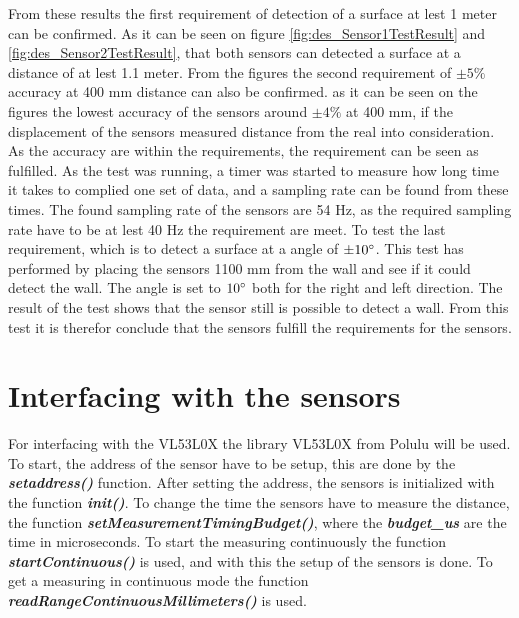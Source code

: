 From these results the first requirement of detection of a surface at lest 1 meter can be confirmed. As it can be seen on figure \ref{fig:des_Sensor1TestResult} and \ref{fig:des_Sensor2TestResult}, that both sensors can detected a surface at a distance of at lest 1.1 meter.
\newline
From the figures the second requirement of $\pm5 \%$ accuracy at 400 mm distance can also be confirmed. as it can be seen on the figures the lowest accuracy of the sensors around $\pm 4 \%$ at 400 mm, if the displacement of the sensors measured distance from the real into consideration. As the accuracy are within the requirements, the requirement can be seen as fulfilled.
\newline
As the test was running, a timer was started to measure how long time it takes to complied one set of data, and a sampling rate can be found from these times. The found sampling rate of the sensors are 54 Hz, as the required sampling rate have to be at lest 40 Hz the requirement are meet.
\newline
To test the last requirement, which is to detect a surface at a angle of  $\pm 10 \degree$. This test has performed by placing the sensors 1100 mm from the wall and see if it could detect the wall. The angle is set to $10 \degree$ both for the right and left direction. The result of the test shows that the sensor still is possible to detect a wall. From this test it is therefor conclude that the sensors fulfill the requirements for the sensors.

%
%
%
\section{Interfacing with the sensors}\label{sec:interfacingVL53L0X}%
For interfacing with the VL53L0X the library VL53L0X from Polulu will be used.
\newline
To start, the address of the sensor have to be setup, this are done by the \textbf{\textit{setaddress()}} function. After setting the address, the sensors is initialized with the function \textbf{\textit{init()}}. To change the time the sensors have to measure the distance, the function \textbf{\textit{setMeasurementTimingBudget()}}, where the  \textbf{\textit{budget{\_}us}} are the time in microseconds.
To start the measuring continuously the function \textbf{\textit{startContinuous()}} is used, and with this the setup of the sensors is done.
To get a measuring in continuous mode the function \textbf{\textit{readRangeContinuousMillimeters()}} is used.

